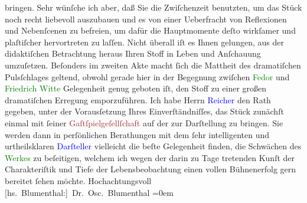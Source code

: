                bringen. Sehr wünſche ich aber, daß Sie die Zwiſchenzeit benutzten, um das Stück noch
               recht liebevoll auszubauen und es von einer Ueberfracht von Reflexionen und
               Nebenſcenen zu befreien, um dafür die Hauptmomente deſto wirkſamer und plaſtiſcher
               hervortreten zu laſſen. Nicht überall iſt es Ihnen gelungen, aus der didaktiſchen
               Betrachtung heraus Ihren Stoff in Leben und Anſchauung umzuſetzen. Beſonders im
               zweiten Akte macht ſich die Mattheit des dramatiſchen Pulsſchlages geltend, obwohl
               gerade hier in der Begegnung zwiſchen \textcolor{green}{Fedor}{} und \textcolor{green}{Friedrich Witte}{} Gelegenheit genug geboten iſt, den Stoff zu einer großen
               dramatiſchen Erregung emporzuführen.\pend
           \pstart
           {\pb}Ich habe Herrn \textcolor{blue}{Reicher}{}\ledrightnote{\textcolor{blue}{Emanuel Reicher}} den Rath gegeben, unter der Vorausſetzung Ihres
               Einverſtändniſſes, das Stück zunächſt einmal mit ſeiner \textcolor{brown}{Gaſtſpielgeſellſchaft}{}\ledrightnote{\textcolor{brown}{Emanuel Reicher’s Deutsche Gastspielgesellschaft}} auf der \label{K_L00052_1v}\label{K_L00052_1h} zur Darſtellung zu
               bringen. Sie werden dann in perſönlichen Berathungen mit dem ſehr intelligenten und
               urtheilsklaren \textcolor{blue}{Darſteller}{}
               vielleicht die beſte Gelegenheit finden, die Schwächen des \textcolor{green}{Werkes}{} zu beſeitigen, welchem ich wegen der
               darin zu Tage tretenden Kunſt der Charakteriſtik und Tiefe der Lebensbeobachtung
               einen vollen Bühnenerfolg gern bereitet ſehen möchte.\pend
           \pstart
           Hochachtungsvoll{\\[\baselineskip]}\spacefill\mbox{{[}hs. Blumenthal:{]} Dr. Osc. Blumenthal}\pend
           \leftskip=0em{}\endnumbering{}  
      